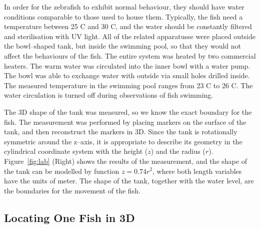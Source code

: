 \documentclass[11pt,twoside]{report}
\begin{document}
In order for the zebrafish to exhibit normal behaviour, they should have water conditions comparable to those used to house them.
Typically, the fish need a temperature between 25 \degree C and 30 \degree C, and the water should be constantly filtered and sterilisation with UV light.
All of the related apparatusse were placed outside the bowl--shaped tank, but inside the swimming pool, so that they would not affect the behaviours of the fish.
The entire system was heated by two commercial heaters. The warm water was circulated into the inner bowl with a water pump. The bowl was able to exchange water with outside via small holes drilled inside. The measured temperature in the swimming pool ranges from 23 \textdegree C to 26 \textdegree C. The water circulation is turned off during observations of fish swimming.


The 3D shape of the tank was measured, so we know the exact boundary for the fish. The measurement was performed by placing markers on the surface of the tank, and then reconstruct the markers in 3D. Since the tank is rotationally symmetric around the z--axis, it is appropriate to describe its geometry in the cylindrical coordinate system with the height ($z$) and the radius ($r$). Figure~\ref{fig:lab} (Right) shows the results of the measurement, and the shape of the tank can be modelled by function $z=0.74 r^2$, where both length variables have the units of meter. The shape of the tank, together with the water level, are the boundaries for the movement of the fish.



\subsection{Locating One Fish in 3D}
\label{section:locate_3d}
\end{document}
